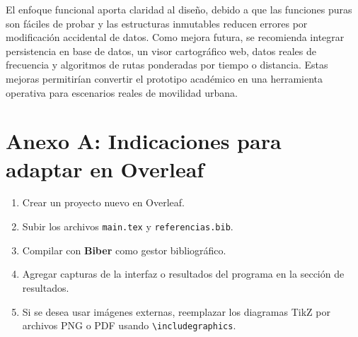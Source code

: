 \documentclass[stu,12pt,floatsintext]{apa7}
\begin{document}
El enfoque funcional aporta claridad al diseño, debido a que las funciones puras son fáciles de probar y las estructuras inmutables reducen errores por modificación accidental de datos. Como mejora futura, se recomienda integrar persistencia en base de datos, un visor cartográfico web, datos reales de frecuencia y algoritmos de rutas ponderadas por tiempo o distancia. Estas mejoras permitirían convertir el prototipo académico en una herramienta operativa para escenarios reales de movilidad urbana.

\printbibliography

\appendix
\section{Anexo A: Indicaciones para adaptar en Overleaf}
\begin{enumerate}
    \item Crear un proyecto nuevo en Overleaf.
    \item Subir los archivos \texttt{main.tex} y \texttt{referencias.bib}.
    \item Compilar con \textbf{Biber} como gestor bibliográfico.
    \item Agregar capturas de la interfaz o resultados del programa en la sección de resultados.
    \item Si se desea usar imágenes externas, reemplazar los diagramas TikZ por archivos PNG o PDF usando \texttt{\textbackslash includegraphics}.
\end{enumerate}
\end{document}
